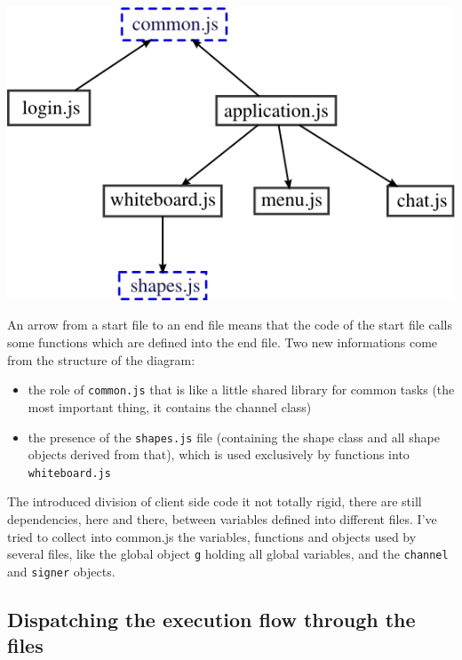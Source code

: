 \documentclass[10pt,a4paper,english]{book}
\begin{document}
\includegraphics{images/client_file_use.png}

An arrow from a start file to an end file means that the code of the
start file calls some functions which are defined into the end
file. Two new informations come from the structure of the diagram:
\begin{itemize}
\item {} 
the role of \texttt{common.js} that is like a little shared library for
common tasks (the most important thing, it contains the channel
class)

\item {} 
the presence of the \texttt{shapes.js} file (containing the shape class
and all shape objects derived from that), which is used exclusively
by functions into \texttt{whiteboard.js}

\end{itemize}

The introduced division of client side code it not totally rigid,
there are still dependencies, here and there, between variables
defined into different files. I've tried to collect into common.js the
variables, functions and objects used by several files, like the
global object \texttt{g} holding all global variables, and the \texttt{channel}
and \texttt{signer} objects.



\hypertarget{dispatching-the-execution-flow-through-the-files}{}
\subsection{Dispatching the execution flow through the files}
\label{dispatching-the-execution-flow-through-the-files}
\end{document}
